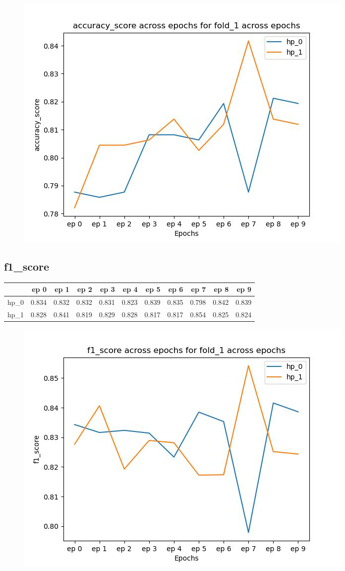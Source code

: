 \documentclass{article}
\begin{document}
\begin{figure}[H]
\includegraphics[scale = 0.75]{fold_1/accuracy_score}
\end{figure}
\subsection{f1\_score}
\begin{tabular}{lrrrrrrrrrr}
\toprule
{} &   ep 0 &   ep 1 &   ep 2 &   ep 3 &   ep 4 &   ep 5 &   ep 6 &   ep 7 &   ep 8 &   ep 9 \\
\midrule
hp\_0 &  0.834 &  0.832 &  0.832 &  0.831 &  0.823 &  0.839 &  0.835 &  0.798 &  0.842 &  0.839 \\
hp\_1 &  0.828 &  0.841 &  0.819 &  0.829 &  0.828 &  0.817 &  0.817 &  0.854 &  0.825 &  0.824 \\
\bottomrule
\end{tabular}

\begin{figure}[H]
\includegraphics[scale = 0.75]{fold_1/f1_score}
\end{figure}
\end{document}
